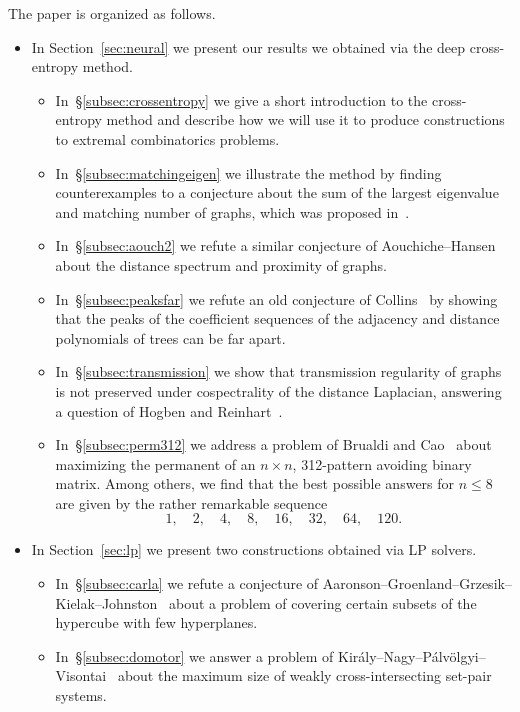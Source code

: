 \documentclass[11pt,english]{article}
\theoremstyle{plain}
\theoremstyle{remark}
\begin{document}
The paper is organized as follows.
\begin{itemize}
\item In Section~\ref{sec:neural} we present our results we obtained via the deep cross-entropy method.
\begin{itemize}
    \item In~\S\ref{subsec:crossentropy} we give a short introduction to the cross-entropy method and describe how we will use it to produce constructions to extremal combinatorics problems.
    \item In~\S\ref{subsec:matchingeigen} we illustrate the method by finding  counterexamples to a conjecture about the sum of the largest eigenvalue and matching number of graphs, which was proposed in~\cite{aouch}. %
    \item In~\S\ref{subsec:aouch2} we refute a similar conjecture of Aouchiche--Hansen~\cite{aouchhansen} about the distance spectrum and proximity of graphs. %
    \item In~\S\ref{subsec:peaksfar} we refute an old conjecture of Collins~\cite{collins} by showing that the peaks of the coefficient sequences of the adjacency and distance polynomials of trees can be far apart.
    \item In~\S\ref{subsec:transmission} we show that transmission regularity of graphs is not preserved under cospectrality of the distance Laplacian, answering a question of Hogben and Reinhart~\cite{surveydistance}.
    \item In~\S\ref{subsec:perm312} we address a problem of Brualdi and Cao~\cite{brualdi} about maximizing the permanent of an $n\times n$, 312-pattern avoiding binary matrix. Among others, we find that the best possible answers for $n\leq 8$ are given by the rather remarkable sequence
    $$1,\quad 2,\quad 4,\quad 8,\quad 16,\quad 32,\quad 64,\quad 120.$$
\end{itemize}
\item In Section~\ref{sec:lp} we present two constructions obtained via LP solvers.
\begin{itemize}
    \item In~\S\ref{subsec:carla} we refute a conjecture of Aaronson–Groenland–Grzesik–Kielak–Johnston~\cite{aaronson} about a problem of covering certain subsets of the hypercube with few hyperplanes.
    \item In~\S\ref{subsec:domotor} we answer a problem of Kir\'aly--Nagy--P\'alv\"olgyi--Visontai~\cite{domotor} about the maximum size of weakly cross-intersecting set-pair systems.
\end{itemize}
\end{itemize}
\end{document}
